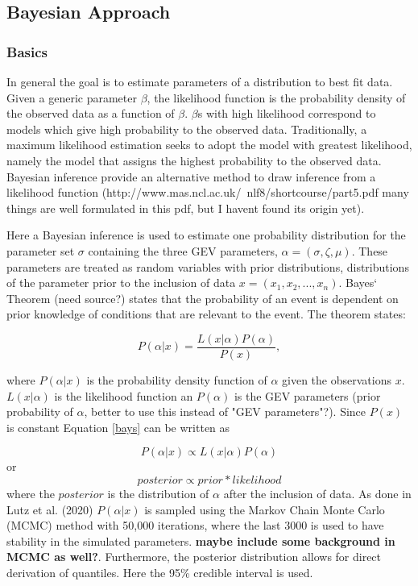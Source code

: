 \documentclass[12pt]{article}
\begin{document}
{\subsection{Bayesian Approach}
\subsubsection{Basics}
In general the goal is to estimate parameters of a distribution to best fit data. Given a generic parameter $\beta$, the likelihood function is the probability density of the observed data as a function of $\beta$. $\beta$s with high likelihood correspond to models which give high probability to the observed data. Traditionally, a maximum likelihood estimation seeks to adopt the model with greatest likelihood, namely the model that assigns the highest probability to the observed data. Bayesian inference provide an alternative method to draw inference from a likelihood function (http://www.mas.ncl.ac.uk/~nlf8/shortcourse/part5.pdf many things are well formulated in this pdf, but I havent found its origin yet). 

Here a Bayesian inference is used to estimate one probability distribution for the parameter set $\sigma$ containing the three GEV parameters, $\alpha = (\sigma, \zeta, \mu)$. These parameters are treated as random variables with prior distributions, distributions of the parameter prior to the inclusion of data $x = (x_1, x_2,...,x_n)$. Bayes` Theorem (need source?) states that the probability of an event is dependent on prior knowledge of conditions that are relevant to the event. The theorem states:

\begin{equation}
P(\alpha \vert x) = \frac{L(x \vert \alpha)P(\alpha)}{P(x)},
\label{bays}
\end{equation}

where $P(\alpha \vert x)$ is the probability density function of $\alpha$ given the observations $x$. $L(x \vert \alpha)$ is the likelihood function an $P(\alpha)$ is the GEV parameters (prior probability of $\alpha$, better to use this instead of "GEV parameters"?). Since $P(x)$ is constant Equation \eqref{bays} can be written as 

\begin{equation}
P(\alpha \vert x)\propto L(x \vert \alpha)P(\alpha)
\end{equation}  
or
\begin{equation}
posterior \propto prior * likelihood
\end{equation}
where the $posterior$ is the distribution of $\alpha$ after the inclusion of data. As done in Lutz et al. (2020) $P(\alpha \vert x)$ is sampled using the Markov Chain Monte Carlo (MCMC) method with 50,000 iterations, where the last 3000 is used to have stability in the simulated parameters. \textbf{maybe include some background in MCMC as well?}. Furthermore, the posterior distribution allows for direct derivation of quantiles. Here the 95\% credible interval is used.  
}
\end{document}
